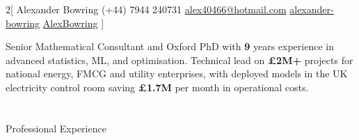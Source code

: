 \documentclass{my_cv}
\begin{document}
\vspace{-20cm}
\begin{multicols}{2}[
    \titletext{}%
    		{Alexander Bowring}
        {}%
        {(+44) 7944 240731}%
        {\href{mailto:alex40466@hotmail.com}{alex40466@hotmail.com}}%
        {\href{https://www.linkedin.com/in/alexander-bowring/}{alexander-bowring}}%
        {\href{https://github.com/AlexBowring/}{AlexBowring}}
]

\end{multicols}
\vspace{-1.8cm}
{\centering
Senior Mathematical Consultant and Oxford PhD with \textbf{9} years experience in advanced statistics, ML, and optimisation.
Technical lead on \textbf{£2M+} projects for national energy, FMCG and utility enterprises, with deployed models in the UK electricity control room saving \textbf{£1.7M} per month in operational costs. 
}

\vspace{-0.2cm}

\section{\faBriefcase}{Professional Experience}
\end{document}
